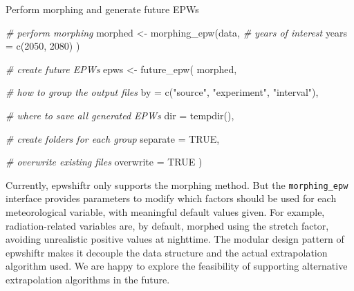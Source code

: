 \documentclass[twocolumn, a4paper,10pt]{article}
\makeatletter
\newenvironment{Code}{\captionsetup{type=code}}{}
\newenvironment{Shaded}{\begin{mdframed}[skipabove=0pt]}{\end{mdframed}}
\newcommand{\AttributeTok}[1]{\textcolor[rgb]{0.77,0.63,0.00}{#1}}
\newcommand{\CommentTok}[1]{\textcolor[rgb]{0.56,0.35,0.01}{\textit{#1}}}
\newcommand{\ConstantTok}[1]{\textcolor[rgb]{0.00,0.00,0.00}{#1}}
\newcommand{\DecValTok}[1]{\textcolor[rgb]{0.00,0.00,0.81}{#1}}
\newcommand{\FunctionTok}[1]{\textcolor[rgb]{0.00,0.00,0.00}{#1}}
\newcommand{\NormalTok}[1]{#1}
\newcommand{\OtherTok}[1]{\textcolor[rgb]{0.56,0.35,0.01}{#1}}
\newcommand{\StringTok}[1]{\textcolor[rgb]{0.31,0.60,0.02}{#1}}
\renewcommand\section{\@startsection{section}{1}{\z@}{3pt}{3pt}{\normalfont\large\bfseries}}
\makeatother
\begin{document}
\begin{Code}
\caption{Perform morphing and generate future EPWs}

\label{lst:epw}

\begin{Shaded}
\begin{Highlighting}[]
\CommentTok{\# perform morphing}
\NormalTok{morphed }\OtherTok{\textless{}{-}} \FunctionTok{morphing\_epw}\NormalTok{(data,}
  \CommentTok{\# years of interest}
  \AttributeTok{years =} \FunctionTok{c}\NormalTok{(}\DecValTok{2050}\NormalTok{, }\DecValTok{2080}\NormalTok{)}
\NormalTok{)}

\CommentTok{\# create future EPWs}
\NormalTok{epws }\OtherTok{\textless{}{-}} \FunctionTok{future\_epw}\NormalTok{(}
\NormalTok{  morphed,}

  \CommentTok{\# how to group the output files}
  \AttributeTok{by =} \FunctionTok{c}\NormalTok{(}\StringTok{"source"}\NormalTok{, }\StringTok{"experiment"}\NormalTok{, }\StringTok{"interval"}\NormalTok{),}

  \CommentTok{\# where to save all generated EPWs}
  \AttributeTok{dir =} \FunctionTok{tempdir}\NormalTok{(),}

  \CommentTok{\# create folders for each group}
  \AttributeTok{separate =} \ConstantTok{TRUE}\NormalTok{,}

  \CommentTok{\# overwrite existing files}
  \AttributeTok{overwrite =} \ConstantTok{TRUE}
\NormalTok{)}
\end{Highlighting}
\end{Shaded}

\end{Code}

Currently, epwshiftr only supports the morphing method. But the \texttt{morphing\_epw}
interface provides parameters to modify which factors should be used for each
meteorological variable, with meaningful default values given. For example,
radiation-related variables are, by default, morphed using the stretch factor,
avoiding unrealistic positive values at nighttime. The modular design pattern of
epwshiftr makes it decouple the data structure and the actual extrapolation
algorithm used. We are happy to explore the feasibility of supporting
alternative extrapolation algorithms in the future.

\section{Conclusion}\label{conclusion}
\end{document}
